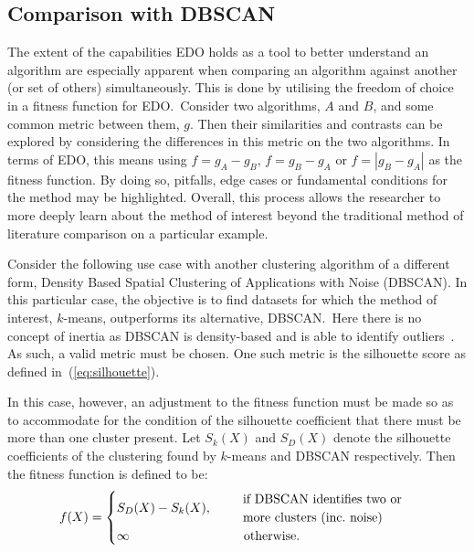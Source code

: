 \documentclass[smallextended]{svjour3}
\begin{document}
\subsection{Comparison with DBSCAN}\label{subsec:dbscan}

The extent of the capabilities EDO holds as a tool to better understand an
algorithm are especially apparent when comparing an algorithm against another
(or set of others) simultaneously. This is done by utilising the freedom of
choice in a fitness function for EDO.\ Consider two algorithms, \(A\) and \(B\),
and some common metric between them, \(g\). Then their similarities and
contrasts can be explored by considering the differences in this metric on the
two algorithms. In terms of EDO, this means using \(f = g_A - g_B\), \(f = g_B -
g_A\) or \(f = \left| g_B - g_A \right|\) as the fitness function. By doing so,
pitfalls, edge cases or fundamental conditions for the method may be
highlighted. Overall, this process allows the researcher to more deeply learn
about the method of interest beyond the traditional method of literature
comparison on a particular example.

Consider the following use case with another clustering algorithm of a different
form, Density Based Spatial Clustering of Applications with Noise (DBSCAN). In
this particular case, the objective is to find datasets for which the method of
interest, \(k\)-means, outperforms its alternative, DBSCAN.\ Here there is no
concept of inertia as DBSCAN is density-based and is able to identify
outliers~\cite{Ester1996}. As such, a valid metric must be chosen. One such
metric is the silhouette score as defined in~(\ref{eq:silhouette}).

In this case, however, an adjustment to the fitness function must be made so as
to accommodate for the condition of the silhouette coefficient that there must
be more than one cluster present. Let \(S_k (X)\) and \(S_D (X)\) denote the
silhouette coefficients of the clustering found by \(k\)-means and DBSCAN
respectively. Then the fitness function is defined to be:
\begin{equation}
    f(X) = 
        \begin{cases}
            S_D (X) - S_k (X), &\quad \text{%
                \begin{tabular}{l}%
                    if DBSCAN identifies two or
                    \\
                    more clusters (inc.\ noise)
                \end{tabular}
            }\\
            \infty &\quad \ \ \text{otherwise.}
        \end{cases}\label{eq:dbscan-fitness}
\end{equation}
\end{document}
